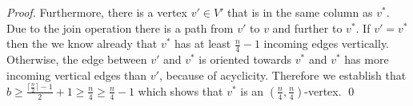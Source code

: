 \documentclass[runningheads,a4paper]{llncs}
\newcommand{\MM}[1]{\marginpar{\parbox{3.6cm}{{\small {\bf MM:} #1}}}} %
\newcommand{\AT}[1]{\marginpar{\parbox{3.6cm}{{\small {\bf AT:} #1}}}} %
\newcommand{\join}{\mbox{join}\xspace}
\begin{document}
\begin{proof}
Furthermore, there is a vertex $v' \in V'$ that is in the same column as $v^*$. Due to the \join operation there is a path from $v'$ to $v$ and further to $v^*$. 
If $v'=v^*$ then the we know already that $v^*$ has at least $\frac{n}{4} - 1$ incoming edges vertically.
Otherwise,  the edge between $v'$ and $v^*$ is oriented towards $v^*$ and $v^*$ has more incoming vertical edges than $v'$, because of acyclicity. Therefore we establish that $b \geq \frac{\lceil \frac{n}{2}\rceil-1}{2} + 1 \geq \frac{n}{4} \geq \frac{n}{4} - 1$ which shows that $v^*$ is an $(\frac{n}{4}, \frac{n}{4})$-vertex. \qed


   
\end{proof}
\end{document}
